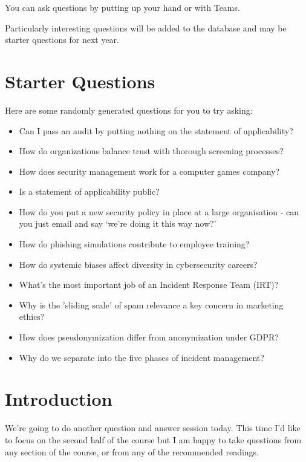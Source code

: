 \documentclass[12pt]{article}
\begin{document}
You can ask questions by putting up your hand or with Teams.  

Particularly interesting questions will be added to the database and may be starter questions for next year.  

\section*{Starter Questions} 
Here are some randomly generated questions for you to try asking: 

\begin{itemize}
  \item Can I pass an audit by putting nothing on the statement of applicability?
  \item How do organizations balance trust with thorough screening processes?
  \item How does security management work for a computer games company?
  \item Is a statement of applicability public?
  \item How do you put a new security policy in place at a large organisation - can you just email and say `we're doing it this way now?'
  \item How do phishing simulations contribute to employee training?
  \item How do systemic biases affect diversity in cybersecurity careers?
  \item What's the most important job of an Incident Response Team (IRT)?
  \item Why is the 'sliding scale' of spam relevance a key concern in marketing ethics?
  \item How does pseudonymization differ from anonymization under GDPR?
  \item Why do we separate into the five phases of incident management?
\end{itemize}


%
%



\maketitle

\section*{Introduction}
We're going to do another question and answer session today. This time I'd like to focus on the second half of the course but I am happy to take questions from any section of the course, or from any of the recommended readings. 
\end{document}
